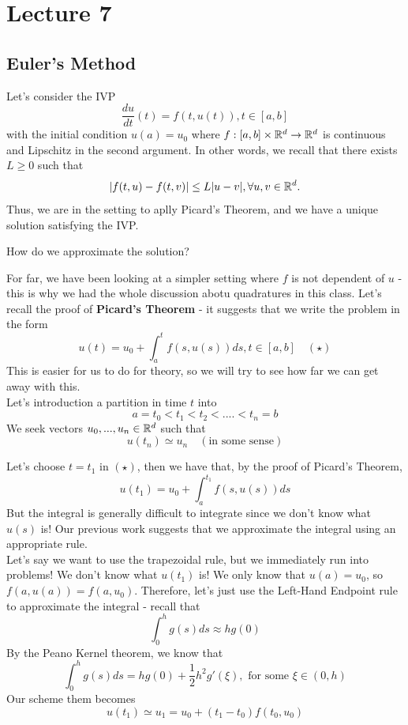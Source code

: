 \documentclass{article}
\begin{document}
\newpage
\section{Lecture 7}

\subsection{Euler's Method}

Let's consider the IVP
\[\frac{du}{dt}(t) = f(t, u(t)), t \in [a, b]\]
with the initial condition $u(a) = u_0$ where $f: [a, b] \times \mathbb{R}^d \to \mathbb{R}^d$ is continuous and Lipschitz in the second argument. In other words, we recall that there exists $L \geq 0$ such that
\[|f(t, u) - f(t, v)| \leq L |u - v|, \forall u, v \in \mathbb{R}^d.\]
Thus, we are in the setting to aplly Picard's Theorem, and we have a unique solution satisfying the IVP.

\begin{question}
    How do we approximate the solution?
\end{question}
For far, we have been looking at a simpler setting where $f$ is not dependent of $u$ - this is why we had the whole discussion abotu quadratures in this class. Let's recall the proof of \textbf{Picard's Theorem} - it suggests that we write the problem in the form
\[u(t) = u_0 + \int_a^t f(s, u(s)) ds, t \in [a, b]\quad (\star)\]
This is easier for us to do for theory, so we will try to see how far we can get away with this.\\

Let's introduction a partition in time $t$ into
\[a = t_0 < t_1 < t_2 < .... < t_n = b\]
We seek vectors $u_0, ..., u_n \in \mathbb{R}^d$ such that 
\[u(t_n) \simeq u_n\quad (\text{in some sense})\]

Let's choose $t = t_1$ in $(\star)$, then we have that, by the proof of Picard's Theorem,
\[u(t_1) = u_0 + \int_a^{t_1} f(s, u(s)) ds\]
But the integral is generally difficult to integrate since we don't know what $u(s)$ is! Our previous work suggests that we approximate the integral using an appropriate rule.\\

Let's say we want to use the trapezoidal rule, but we immediately run into problems! We don't know what $u(t_1)$ is! We only know that $u(a) = u_0$, so $f(a, u(a)) = f(a, u_0)$. Therefore, let's just use the Left-Hand Endpoint rule to approximate the integral - recall that
\[\int_0^h g(s) ds \approx h g(0)\]
By the Peano Kernel theorem, we know that
\[\int_0^h g(s) ds = h g(0) + \frac{1}{2} h^2 g'(\xi), \text{ for some } \xi \in (0, h)\]
Our scheme them becomes 
\[u(t_1) \simeq u_1 = u_0 + (t_1 - t_0) f(t_0, u_0) \]
\end{document}
